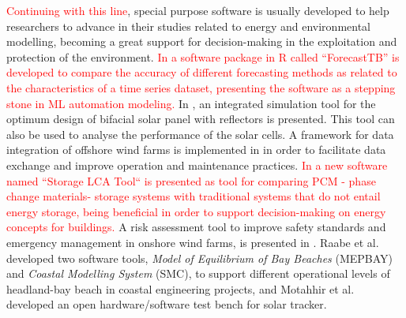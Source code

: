 \documentclass[energies,article,submit,moreauthors,pdftex]{Definitions/mdpi}
\begin{document}
		\textcolor{red}{Continuing with this line}, special purpose software is usually developed to help researchers to advance in their studies related to energy and environmental modelling, becoming a great support for decision-making in the exploitation and protection of the environment. \textcolor{red}{In \cite{Neeraj2020} a software package in R called ``ForecastTB'' is developed to compare the accuracy of different forecasting methods as related to the characteristics of a time series dataset, presenting the software as a stepping stone in ML automation modeling.}
		In \cite{LO2015293}, an integrated simulation tool for the optimum design of bifacial solar panel with reflectors is presented. This tool can also be used to analyse the performance of the solar cells. A framework for data integration of offshore wind farms is implemented in \cite{NGUYEN2013150} in order to facilitate data exchange and improve operation and maintenance practices. 
		\textcolor{red}{In \cite{Roberta2020} a new software named ``Storage LCA Tool`` is presented as tool for comparing PCM - phase change materials- storage systems  with traditional systems that do not entail energy storage, being beneficial in order to support decision-making on energy concepts for buildings.}
		A risk assessment tool to improve safety standards and emergency management in onshore wind farms, is presented in \cite{ASTIASOGARCIA201648}. Raabe et al. \cite{RAABE2010213} developed two software tools, \textit{Model of Equilibrium of Bay Beaches} (MEPBAY) and \textit{Coastal Modelling System} (SMC), to support different operational levels of headland-bay beach in coastal engineering projects, and Motahhir et al. \cite{MOTAHHIR20199} developed an open hardware/software test bench for solar tracker.
		
\end{document}

